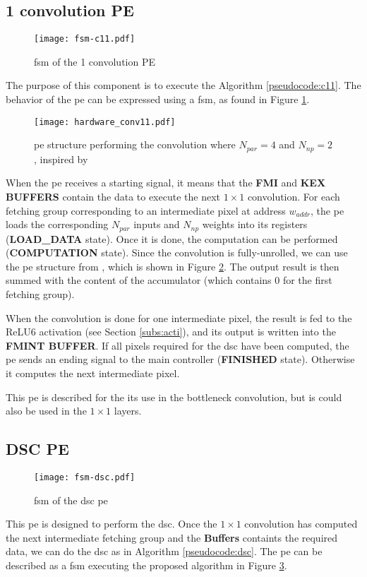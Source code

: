 \subsection{1 convolution PE}
%
\begin{figure}
    \centering
    \texttt{[image: fsm-c11.pdf]}
    \caption{\acrshort{fsm} of the 1 convolution PE}
    \label{fig:fsm_c11}
\end{figure}
%
The purpose of this component is to execute the Algorithm \ref{pseudocode:c11}. The behavior of the \acrshort{pe} can be expressed using a \acrshort{fsm}, as found in Figure \ref{fig:fsm_c11}.

\begin{figure}
    \centering
    \texttt{[image: hardware\_conv11.pdf]}
    \caption{\acrshort{pe} structure performing the convolution where $N_{par} = 4$ and $N_{np} = 2$, inspired by \cite{kang_accelerator-aware_2020}}
    \label{fig:c11_hardware}
\end{figure}
%
When the \acrshort{pe} receives a starting signal, it means that the \textbf{FMI} and \textbf{KEX BUFFERS} contain the data to execute the next $1 \times 1$ convolution. For each fetching group corresponding to an intermediate pixel at address $w_{addr}$, the \acrshort{pe} loads the corresponding $N_{par}$ inputs and $N_{np}$ weights into its registers (\textbf{LOAD\_DATA} state).
Once it is done, the computation can be performed (\textbf{COMPUTATION} state). Since the convolution is fully-unrolled, we can use the \acrshort{pe} structure from \textcite{kang_accelerator-aware_2020}, which is shown in Figure \ref{fig:c11_hardware}. The output result is then summed with the content of the accumulator (which contains 0 for the first fetching group).

When the convolution is done for one intermediate pixel, the result is fed to the ReLU6 activation (see Section \ref{subs:acti}), and its output is written into the \textbf{FMINT BUFFER}. If all pixels required for the \acrshort{dsc} have been computed, the \acrshort{pe} sends an ending signal to the main controller (\textbf{FINISHED} state). Otherwise it computes the next intermediate pixel.

This \acrshort{pe} is described for the its use in the bottleneck convolution, but is could also be used in the $1 \times 1$ layers.
%
\subsection{DSC PE}
%
\begin{figure}
    \centering
    \texttt{[image: fsm-dsc.pdf]}
    \caption{\acrshort{fsm} of the \acrshort{dsc} \acrshort{pe}}
    \label{fig:fsm_dsc}
\end{figure}
This \acrshort{pe} is designed to perform the \acrshort{dsc}. Once the $1 \times 1$ convolution has computed the next intermediate fetching group and the \textbf{Buffers} containts the required data, we can do the \acrshort{dsc} as in Algorithm \ref{pseudocode:dsc}. The \acrshort{pe} can be described as a \acrshort{fsm} executing the proposed algorithm in Figure \ref{fig:fsm_dsc}.

